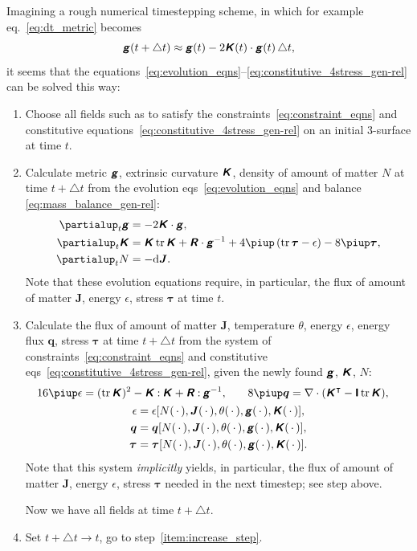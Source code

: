\documentclass[\ifafour a4paper,12pt,\else a5paper,10pt,\fi%
onecolumn,oneside,article,%
british%
]{memoir}
\theoremstyle{remark}
\theoremstyle{innote}
\newcommand*{\mathte}[1]{\textbf{\textit{\textsf{#1}}}}
\newcommand*{\de}{\partialup}%
\newcommand*{\pu}{\piup}%
\newcommand*{\di}{\mathrm{d}}%
\DeclareMathOperator{\tr}{tr}%
\newcommand*{\incr}{\triangle}%
\newcommand*{\dotv}{\mathord{\,\cdot\,}}%
\newcommand*{\con}{\mathbin{:}}%
\renewcommand*{\|}[1][]{\nonscript\,#1\vert\nonscript\;\mathopen{}}
\newcommand*{\eqn}{eq.}%
\newcommand*{\eqns}{eqs}%
\newcommand*{\T}{^\intercal}%
\newcommand*{\yd}{N}
\newcommand*{\yjj}{J}
\newcommand*{\yj}{\bm{\yjj}}
\newcommand*{\yTT}{\tau}
\newcommand*{\yT}{\bm{\yTT}}
\newcommand*{\ygg}{g}
\newcommand*{\yg}{\mathte{\ygg}}
\newcommand*{\yKK}{K}
\newcommand*{\yK}{\mathte{\yKK}}
\newcommand*{\yRR}{R}
\newcommand*{\yR}{\mathte{\yRR}}
\newcommand*{\ypp}{q}
\newcommand*{\yp}{\bm{\ypp}}
\newcommand*{\ye}{\epsilon}
\newcommand*{\yte}{\theta}
\newcommand*{\ynab}{\nabla}
\newcommand*{\yto}{t}
\newcommand*{\yI}{\textsf{\textbf{I}}}
\begin{document}
Imagining a rough numerical timestepping scheme, in which for example
\eqn~\eqref{eq:dt_metric} becomes
\begin{equation}
  \label{eq:approx_timestepping_dt_metric}
  \yg(t + \incr t) \approx \yg(t) -2\yK(t)\cdot\yg(t)\,\incr t,
\end{equation}
it seems that the
equations~\eqref{eq:evolution_eqns}--\eqref{eq:constitutive_4stress_gen-rel}
can be solved this way:
\begin{enumerate}[leftmargin=1.5\parindent]
\item Choose all fields such as to satisfy the
  constraints~\eqref{eq:constraint_eqns} and constitutive
  equations~\eqref{eq:constitutive_4stress_gen-rel} on an initial 3-surface
  at time $\yto$.
\item\label{item:increase_step}Calculate metric $\yg$, extrinsic curvature
  $\yK$, density of amount of matter $\yd$ at time $\yto + \incr t$ from
  the evolution \eqns~\eqref{eq:evolution_eqns} and balance
  \eqref{eq:mass_balance_gen-rel}:
  \begin{align*}
    \de_t \yg &= -2\yK\cdot\yg,
    \\
    \de_t \yK &=  \yK\tr\yK + \yR\cdot\yg^{-1} + 4\pu\,(\tr\yT-\ye) - 8\pu\yT,
    \\
    \de_t\yd &= - \di\yj.
  \end{align*}
  Note that these evolution equations require, in particular, the flux of
  amount of matter $\yj$, energy $\ye$, stress $\yT$ at time $\yto$.
\item\label{item:increase_step_energy}Calculate the  flux of amount of matter $\yj$,
  temperature $\yte$, energy $\ye$, energy flux $\yp$, stress $\yT$ at time
  $\yto + \incr t$ from the system of
  constraints~\eqref{eq:constraint_eqns} and constitutive
  \eqns~\eqref{eq:constitutive_4stress_gen-rel}, given the newly found
  $\yg$, $\yK$, $\yd$:
  \begin{gather*}
    \begin{aligned}
    16\pu\ye &= (\tr\yK)^2 - \yK\con\yK + \yR\con\yg^{-1},
    &\quad
      8\pu\yp &= \ynab\cdot(\yK\T - \yI\tr\yK),
    \end{aligned}\\
    \ye = \ye[\yd(\dotv),\yj(\dotv),\yte(\dotv),\yg(\dotv), \yK(\dotv)],
    \\
      \yp = \yp[\yd(\dotv),\yj(\dotv),\yte(\dotv),\yg(\dotv), \yK(\dotv)],
      \\
      \yT = \yT[\yd(\dotv),\yj(\dotv),\yte(\dotv),\yg(\dotv), \yK(\dotv)].
  \end{gather*}
  Note that this system \emph{implicitly} yields, in particular, the flux
  of amount of matter $\yj$, energy $\ye$, stress $\yT$ needed in the next
  timestep; see step above.

  Now we have all fields at time $\yto + \incr t$.

\item Set $\yto + \incr t \to \yto$, go to step~\ref{item:increase_step}.
\end{enumerate}
\end{document}
